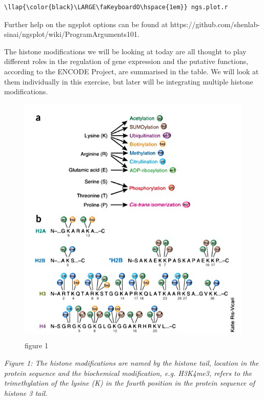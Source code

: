 \documentclass[11pt]{article}
\makeatletter
\def\maxwidth{\ifdim\Gin@nat@width>\linewidth\linewidth
    \else\Gin@nat@width\fi}
\let\Oldincludegraphics\includegraphics
\renewcommand{\includegraphics}[1]{\Oldincludegraphics[width=.8\maxwidth, height=.55\textheight, keepaspectratio]{#1}}
\makeatother
\begin{document}
\begin{terminalinput}
\begin{Verbatim}[commandchars=\\\{\}]
\llap{\color{black}\LARGE\faKeyboardO\hspace{1em}} ngs.plot.r
\end{Verbatim}
\end{terminalinput}


    Further help on the ngsplot options can be found at
https://github.com/shenlab-sinai/ngsplot/wiki/ProgramArguments101.

The histone modifications we will be looking at today are all thought to
play different roles in the regulation of gene expression and the
putative functions, according to the ENCODE Project, are summarised in
the table. We will look at them individually in this exercise, but later
will be integrating multiple histone modifications.

\newpage

    \begin{figure}[!h]
\centering
\includegraphics{images/figure1.png}
\caption{figure 1}
\end{figure}

    \textit{Figure 1: The histone modifications are named by the histone tail,
location in the protein sequence and the biochemical modification, e.g.
H3K4me3, refers to the trimethylation of the lysine (K) in the fourth
position in the protein sequence of histone 3 tail.}
\end{document}
